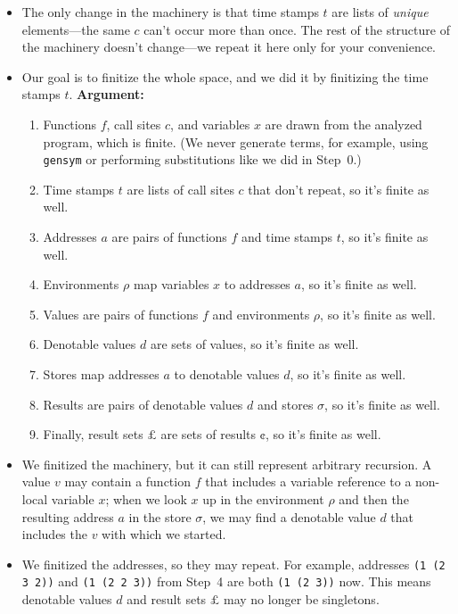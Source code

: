 \documentclass[12pt, oneside]{book}
\begin{document}
\begin{itemize}
  \item The only change in the machinery is that time stamps \(t\) are lists of \emph{unique} elements—the same \(c\) can’t occur more than once. The rest of the structure of the machinery doesn’t change—we repeat it here only for your convenience.
  \item Our goal is to finitize the whole space, and we did it by finitizing the time stamps \(t\). \textbf{Argument:}
        \begin{enumerate}
          \item Functions \(f\), call sites \(c\), and variables \(x\) are drawn from the analyzed program, which is finite. (We never generate terms, for example, using \texttt{gensym} or performing substitutions like we did in Step~0.)
          \item Time stamps \(t\) are lists of call sites \(c\) that don’t repeat, so it’s finite as well.
          \item Addresses \(a\) are pairs of functions \(f\) and time stamps \(t\), so it’s finite as well.
          \item Environments \(ρ\) map variables \(x\) to addresses \(a\), so it’s finite as well.
          \item Values are pairs of functions \(f\) and environments \(ρ\), so it’s finite as well.
          \item Denotable values \(d\) are sets of values, so it’s finite as well.
          \item Stores map addresses \(a\) to denotable values \(d\), so it’s finite as well.
          \item Results are pairs of denotable values \(d\) and stores \(σ\), so it’s finite as well.
          \item Finally, result sets \(£\) are sets of results \(¢\), so it’s finite as well.
        \end{enumerate}
  \item We finitized the machinery, but it can still represent arbitrary recursion. A value \(v\) may contain a function \(f\) that includes a variable reference to a non-local variable \(x\); when we look \(x\) up in the environment \(ρ\) and then the resulting address \(a\) in the store \(σ\), we may find a denotable value \(d\) that includes the \(v\) with which we started.
  \item We finitized the addresses, so they may repeat. For example, addresses \texttt{(1 (2 3 2))} and \texttt{(1 (2 2 3))} from Step~4 are both \texttt{(1 (2 3))} now. This means denotable values \(d\) and result sets \(£\) may no longer be singletons.
\end{itemize}
\end{document}
